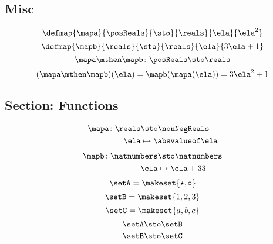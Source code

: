 {\begin{forslides}
    \subsection{Misc}

    \begin{equation}
        \label{eq:slides_session2_198}
        \defmap{\mapa}{\posReals}{\sto}{\reals}{\ela}{\ela^2}
    \end{equation}
    \begin{equation}
        \label{eq:slides_session2_199}
        \defmap{\mapb}{\reals}{\sto}{\reals}{\ela}{3\ela + 1}
    \end{equation}
    \begin{equation}
        \label{eq:slides_session2_200}
        \mapa \mthen \mapb \colon \posReals \sto \reals
    \end{equation}
    \begin{equation}
        \label{eq:slides_session2_201}
        (\mapa \mthen \mapb)(\ela) = \mapb(\mapa(\ela)) = 3 \ela^2 + 1
    \end{equation}

    \subsection{Section: Functions}

    \begin{equation}
        \label{eq:quiz_inj_1}
        \begin{aligned}
            \mapa\colon \reals & \sto \nonNegReals \\
            \ela               & \mapsto \absvalueof \ela
        \end{aligned}
    \end{equation}
    \begin{equation}
        \label{eq:quiz_inj_2}
        \begin{aligned}
            \mapb\colon \natnumbers & \sto \natnumbers \\
            \ela                    & \mapsto \ela + 33
        \end{aligned}
    \end{equation}
    \begin{equation}
        \label{eq:quiz_isos_1}
        \setA=\makeset{{{\star}}, \circ}
    \end{equation}
    \begin{equation}
        \label{eq:quiz_isos_2}
        \setB=\makeset{1, 2, 3}
    \end{equation}
    \begin{equation}
        \label{eq:quiz_isos_3}
        \setC=\makeset{a, b, c}
    \end{equation}
    \begin{equation}
        \label{eq:quiz_isos_4}
        \setA \sto \setB
    \end{equation}
    \begin{equation}
        \label{eq:quiz_isos_5}
        \setB \sto \setC
    \end{equation}

\end{forslides}
}
